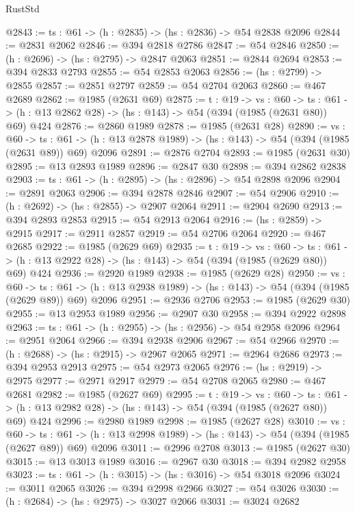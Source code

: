 \begin{lexlean}{RustStd}
\begin{coremodule}
{\begin{coremodule}
{{{{{{{{@2843 := {ts : @61} -> (h : @2835) -> (hs : @2836) -> @54 @2838 @2096
@2844 := @2831 @2062
@2846 := @394 @2818 @2786
@2847 := @54 @2846
@2850 := (h : @2696) -> (hs : @2795) -> @2847 @2063
@2851 := @2844 @2694
@2853 := @394 @2833 @2793
@2855 := @54 @2853 @2063
@2856 := (hs : @2799) -> @2855
@2857 := @2851 @2797
@2859 := @54 @2704 @2063
@2860 := @467 @2689
@2862 := @1985 (@2631 @69)
@2875 := {t : @19} ->
  {vs : @60} ->
  {ts : @61} -> (h : @13 @2862 @28) -> (hs : @143) -> @54 (@394 (@1985 (@2631 @80)) @69) @424
@2876 := @2860 @1989
@2878 := @1985 (@2631 @28)
@2890 := {vs : @60} ->
  {ts : @61} -> (h : @13 @2878 @1989) -> (hs : @143) -> @54 (@394 (@1985 (@2631 @89)) @69) @2096
@2891 := @2876 @2704
@2893 := @1985 (@2631 @30)
@2895 := @13 @2893 @1989
@2896 := @2847 @30
@2898 := @394 @2862 @2838
@2903 := {ts : @61} -> (h : @2895) -> (hs : @2896) -> @54 @2898 @2096
@2904 := @2891 @2063
@2906 := @394 @2878 @2846
@2907 := @54 @2906
@2910 := (h : @2692) -> (hs : @2855) -> @2907 @2064
@2911 := @2904 @2690
@2913 := @394 @2893 @2853
@2915 := @54 @2913 @2064
@2916 := (hs : @2859) -> @2915
@2917 := @2911 @2857
@2919 := @54 @2706 @2064
@2920 := @467 @2685
@2922 := @1985 (@2629 @69)
@2935 := {t : @19} ->
  {vs : @60} ->
  {ts : @61} -> (h : @13 @2922 @28) -> (hs : @143) -> @54 (@394 (@1985 (@2629 @80)) @69) @424
@2936 := @2920 @1989
@2938 := @1985 (@2629 @28)
@2950 := {vs : @60} ->
  {ts : @61} -> (h : @13 @2938 @1989) -> (hs : @143) -> @54 (@394 (@1985 (@2629 @89)) @69) @2096
@2951 := @2936 @2706
@2953 := @1985 (@2629 @30)
@2955 := @13 @2953 @1989
@2956 := @2907 @30
@2958 := @394 @2922 @2898
@2963 := {ts : @61} -> (h : @2955) -> (hs : @2956) -> @54 @2958 @2096
@2964 := @2951 @2064
@2966 := @394 @2938 @2906
@2967 := @54 @2966
@2970 := (h : @2688) -> (hs : @2915) -> @2967 @2065
@2971 := @2964 @2686
@2973 := @394 @2953 @2913
@2975 := @54 @2973 @2065
@2976 := (hs : @2919) -> @2975
@2977 := @2971 @2917
@2979 := @54 @2708 @2065
@2980 := @467 @2681
@2982 := @1985 (@2627 @69)
@2995 := {t : @19} ->
  {vs : @60} ->
  {ts : @61} -> (h : @13 @2982 @28) -> (hs : @143) -> @54 (@394 (@1985 (@2627 @80)) @69) @424
@2996 := @2980 @1989
@2998 := @1985 (@2627 @28)
@3010 := {vs : @60} ->
  {ts : @61} -> (h : @13 @2998 @1989) -> (hs : @143) -> @54 (@394 (@1985 (@2627 @89)) @69) @2096
@3011 := @2996 @2708
@3013 := @1985 (@2627 @30)
@3015 := @13 @3013 @1989
@3016 := @2967 @30
@3018 := @394 @2982 @2958
@3023 := {ts : @61} -> (h : @3015) -> (hs : @3016) -> @54 @3018 @2096
@3024 := @3011 @2065
@3026 := @394 @2998 @2966
@3027 := @54 @3026
@3030 := (h : @2684) -> (hs : @2975) -> @3027 @2066
@3031 := @3024 @2682
}}}}}}}}
\end{coremodule}}
\end{coremodule}
\end{lexlean}
